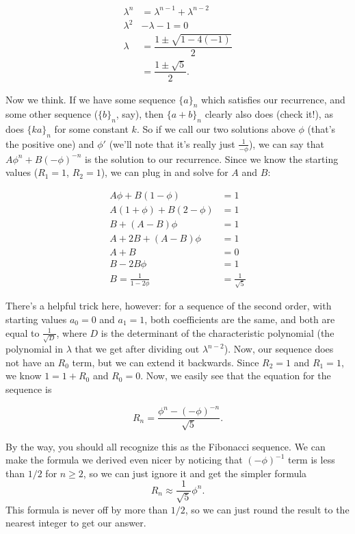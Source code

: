 \documentclass[12pt,letterpaper]{article}
\begin{document}
\begin{align*}
\lambda^n & = \lambda^{n-1} + \lambda^{n-2} \\
\lambda^2 & - \lambda - 1 = 0 \\
\lambda & = \dfrac{1 \pm \sqrt{1 - 4 (-1)}}{2} \\
        & = \dfrac{1 \pm \sqrt{5}}{2}.
\end{align*}

Now we think. If we have some sequence $\{a\}_n$ which satisfies our recurrence,
and some other sequence ($\{b\}_n$, say), then $\{a+b\}_n$ clearly also does
(check it!), as does $\{k a\}_n$ for some constant $k$. So if we call our two
solutions above $\phi$ (that's the positive one) and $\phi '$ (we'll note that
it's really just $\frac1{-\phi}$), we can say that $A\phi^n + B(-\phi)^{-n}$ is
the solution to our recurrence. Since we know the starting
values ($R_1 = 1$, $R_2 = 1$), we can plug in and solve for $A$ and
$B$:

\begin{align*}
  A \phi + B (1 - \phi) & = 1 \\
  A (1 + \phi) + B (2 - \phi) & = 1 \\
  B + (A - B) \phi & = 1 \\
  A + 2B + (A - B)\phi & = 1 \\
  A + B & = 0 \\
  B - 2B \phi & = 1 \\
  B = \frac{1}{1-2\phi} & = \frac1{\sqrt{5}}
\end{align*}

There's a helpful trick here, however: for a sequence of the second
order, with starting values $a_0 = 0$ and $a_1 = 1$, both coefficients
are the same, and both are equal to $\frac1{\sqrt{D}}$, where $D$ is the
determinant of the characteristic polynomial (the polynomial
in $\lambda$ that we get after dividing out $\lambda^{n-2}$). Now, our
sequence does not have an $R_0$ term, but we can extend it
backwards. Since $R_2 = 1$ and $R_1 = 1$, we know $1 = 1 + R_0$ and $R_0 = 0$.
Now, we easily see that the equation for the sequence is

$$R_n = \frac{\phi^n - (-\phi)^{-n}}{\sqrt{5}}.$$

By the way, you should all recognize this as the Fibonacci sequence. We
can make the formula we derived even nicer by noticing that
$(-\phi)^{-1}$ term is less than $1/2$ for $n \ge 2$, so we can just ignore
it and get the simpler formula $$R_n \approx \frac1{\sqrt{5}} \phi^n.$$ This
formula is never off by more than $1/2$, so we can just round the result to the
nearest integer to get our answer.
\end{document}

